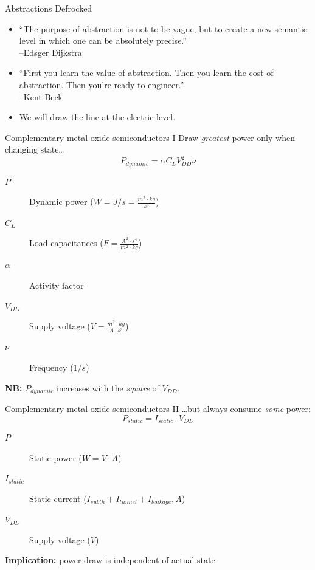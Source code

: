 \documentclass[xcolor={dvipsnames,table}]{beamer}
\begin{document}
\begin{frame}{Abstractions Defrocked}
\begin{itemize}
\item ``The purpose of abstraction is not to be vague, but to create a new semantic level in which one can be absolutely precise.''\\
\hfill--Edsger Dijkstra
\vfill
\item ``First you learn the value of abstraction. Then you learn the cost of abstraction. Then you're ready to engineer.''\\
\hfill--Kent Beck
\vfill
\item We will draw the line at the electric level.
\end{itemize}
\end{frame}

\begin{frame}{Complementary metal-oxide semiconductors I}
Draw \textit{greatest} power only when changing state\ldots
\begin{equation}
P_{dynamic} = \alpha C_LV_{DD}^{2}\nu
\end{equation}
\begin{description}
\item[$P$] Dynamic power ($W = J/s = \frac{m^{2}\cdot kg}{s^{3}}$)
\item[$C_L$] Load capacitances ($F = \frac{A^{2}\cdot s^{4}}{m^{2}\cdot kg}$)
\item[$\alpha$] Activity factor
\item[$V_{DD}$] Supply voltage ($V = \frac{m^{2}\cdot kg}{A\cdot s^{3}}$)
\item[$\nu$] Frequency ($1/s$)
\end{description}
\vfill
\textbf{NB:} $P_{dynamic}$ increases with the \textit{square} of $V_{DD}$.
\end{frame}

\begin{frame}{Complementary metal-oxide semiconductors II}
\ldots but always consume \textit{some} power:
\begin{equation}
P_{static} = I_{static}\cdot V_{DD}
\end{equation}
\begin{description}
\item[$P$] Static power ($W = V\cdot A$)
\item[$I_{static}$] Static current ($I_{subth} + I_{tunnel} + I_{leakage}, A$)
\item[$V_{DD}$] Supply voltage ($V$)
\end{description}
\vfill
\textbf{Implication:} power draw is independent of actual state.
\end{frame}
\end{document}
